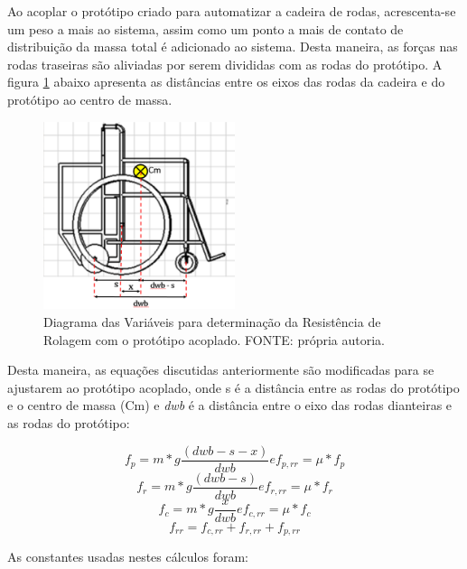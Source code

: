 Ao acoplar o protótipo criado para automatizar a cadeira de rodas, acrescenta-se um peso a mais ao sistema, assim como um ponto a mais de contato de distribuição da massa total é adicionado ao sistema. Desta maneira, as forças nas rodas traseiras são aliviadas por serem divididas com as rodas do protótipo. A figura \ref{fig:finalmente_essa_imagem} abaixo apresenta as distâncias entre os eixos das rodas da cadeira e do protótipo ao centro de massa.

\begin{figure}[!htb]
\centering
\includegraphics[width = 0.5\textwidth]{figuras/resultados/finalmente_essa_imagem}
\caption{Diagrama das Variáveis para determinação da Resistência de Rolagem com o protótipo acoplado. FONTE: própria autoria.}
\label{fig:finalmente_essa_imagem}
\end{figure}

Desta maneira, as equações discutidas anteriormente são modificadas para se ajustarem ao protótipo acoplado, onde s é a distância entre as rodas do protótipo e o centro de massa (Cm) e \textit{dwb} é a distância entre o eixo das rodas dianteiras e as rodas do protótipo:

\begin{equation}
f_p = m*g \frac{(dwb-s-x)}{dwb}   e  f_{p,rr}= \mu*f_p
\end{equation}
\begin{equation}
f_r = m*g \frac{(dwb-s)}{dwb}   e  f_{r,rr}= \mu*f_r
\end{equation}
\begin{equation}
f_c=m*g \frac{x}{dwb}   e  f_{c,rr}= \mu*f_c
\end{equation}
\begin{equation}
f_{rr}=f_{c,rr}+ f_{r,rr}+ f_{p,rr}
\end{equation}

As constantes usadas nestes cálculos foram: 

